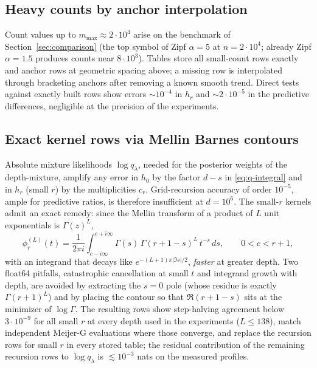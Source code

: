 \documentclass[11pt]{article}
\begin{document}
\subsection{Heavy counts by anchor interpolation}
\label{sec:app-anchors}
Count values up to \(m_{\max}\approx2\cdot10^4\) arise on the benchmark of
Section~\ref{sec:comparison} (the top symbol of Zipf \(\alpha=5\) at
\(n=2\cdot10^4\); already Zipf \(\alpha=1.5\) produces counts near
\(8\cdot10^3\)). Tables store all small-count rows
exactly and anchor rows at geometric spacing above; a missing row is
interpolated through bracketing anchors after removing a known smooth
trend.  Direct tests against exactly built rows show errors
\(\sim10^{-4}\) in \(h_r\) and \(\sim2\cdot10^{-5}\) in the predictive
differences, negligible at the precision of the experiments.


\subsection{Exact kernel rows via Mellin Barnes contours}
\label{sec:app-exact-rows}
Absolute mixture likelihoods \(\log q_\lambda\), needed for the posterior
weights of the depth-mixture, amplify any error in \(h_0\) by the factor
\(d-s\) in \eqref{eq:q-integral} and in \(h_r\) (small \(r\)) by the
multiplicities \(c_r\).  Grid-recursion accuracy of order \(10^{-5}\),
ample for predictive ratios, is therefore insufficient at \(d=10^6\).  The
small-\(r\) kernels admit an exact remedy: since the Mellin transform of a
product of \(L\) unit exponentials is \(\Gamma(z)^L\),
\[
  \phi_r^{(L)}(t)
  =
  \frac{1}{2\pi i}\int_{c-i\infty}^{c+i\infty}
  \Gamma(s)\,\Gamma(r+1-s)^L\,t^{-s}\,ds,
  \qquad 0<c<r+1,
\]
with an integrand that decays like \(e^{-(L+1)\pi|\Im s|/2}\),
\emph{faster} at greater depth.  Two float64 pitfalls, catastrophic
cancellation at small \(t\) and integrand growth with depth, are avoided
by extracting the \(s=0\) pole (whose residue is exactly
\(\Gamma(r+1)^L\)) and by placing the contour so that \(\Re(r+1-s)\) sits
at the minimizer of \(\log\Gamma\).  The resulting rows show step-halving
agreement below \(3\cdot10^{-9}\) for all small \(r\) at every depth used
in the experiments (\(L\le138\)), match independent Meijer-G evaluations
where those converge,
 and
replace the recursion rows for small \(r\) in every stored table; the
residual contribution of the remaining recursion rows to
\(\log q_\lambda\) is \(\lesssim10^{-3}\) nats on the measured profiles.
\end{document}
